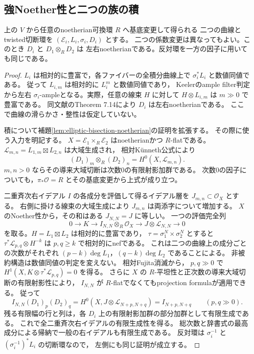 \subsection{強Noether性と二つの族の積}

\begin{lemma}\label{lem:degree-two-gorenstein-bisection}
上の $V$ から任意のnoetherian可換環 $R$ へ基底変更して得られる
二つの曲線とtwisted切断環を $(\mathcal E_i,L_i,\sigma_i,D_i)$ とする。
二つの係数変更は異なってもよい。このとき $D_i$ と $D_1\otimes_R D_2$ は
左右noetherianである。反対環を一方の因子に用いても同じである。
\end{lemma}
\begin{proof}
$L_i$ は相対的に豊富で，各ファイバーの全積分曲線上で
$\sigma_i^*L_i$ と数値同値である。
従って $L_{i,m}$ は相対的に $L_i^m$ と数値同値であり，
Keelerのample filter判定\cite[Theorem 1.3]{Keeler2003}から左右
$\sigma_i$-ampleとなる。実際，任意の線束 $H$ に対して
$H\otimes L_{i,m}$ は $m\gg0$ で豊富である。
同文献のTheorem 7.14により $D_i$ は左右noetherianである。
ここで曲線の滑らかさ・整性は仮定していない。

積について補題\ref{lem:elliptic-bisection-noetherian}の証明を拡張する。
その際に使う入力を明記する。
$X=\mathcal E_1\times_R\mathcal E_2$ はnoetherianかつ $R$-flatである。
$\mathcal L_{m,n}=L_{1,m}\boxtimes L_{2,n}$ は大域生成され，
相対K\"unneth公式により
\[
 (D_1)_m\otimes_R(D_2)_n=H^0(X,\mathcal L_{m,n}).
\]
$m,n>0$ ならその導来大域切断は次数0の有限射影加群である。
次数0の因子についても，$\pi_*\mathcal O=R$ とその基底変更から上式が成り立つ。

二重斉次右イデアル $I$ の各成分を評価して得るイデアル層を
$J_{m,n}\subset\mathcal O_X$ とする。
右側に掛ける線束の大域生成により $J_{m,n}$ は両添字について増加する。
$X$ のNoether性から，その和はある $J_{N,N}=J$ に等しい。
一つの評価完全列
\[
 0\longrightarrow K\longrightarrow I_{N,N}\otimes_R\mathcal O_X
   \longrightarrow J\otimes\mathcal L_{N,N}\longrightarrow0
\]
を取る。$H=L_1\boxtimes L_2$ は相対的に豊富であり，
$\tau=\sigma_1^N\times\sigma_2^N$ とすると
$\tau^*\mathcal L_{p,q}\otimes H^{-k}$ は $p,q\ge k$ で相対的にnefである。
これは二つの曲線上の成分ごとの次数がそれぞれ
$(p-k)\deg L_1$，$(q-k)\deg L_2$ であることによる。
非被約構造は数値同値の判定を変えない。
相対Fujita消滅\cite[Theorem 1.5, Erratum Theorem E2.5]{Keeler2003}から，
$p,q\gg0$ で $H^1(X,K\otimes\tau^*\mathcal L_{p,q})=0$ を得る。
さらに $X$ の $R$-平坦性と正次数の導来大域切断の有限射影性により，
$I_{N,N}$ が $R$-flatでなくてもprojection formulaが適用できる。
従って
\[
 I_{N,N}(D_1)_p(D_2)_q
 =H^0(X,J\otimes\mathcal L_{N+p,N+q})
 =I_{N+p,N+q}\qquad(p,q\gg0).
\]
残る有限幅の行と列は，各 $D_i$ 上の有限射影加群の部分加群として有限生成である。
これで全二重斉次右イデアルの有限生成性を得る。
総次数と辞書式の最高成分による帰納で一般の右イデアルも有限生成である。
反対環は $\sigma_i^{-1}$ と $(\sigma_i^{-1})^*L_i$ の切断環なので，
左側にも同じ証明が成立する。
\end{proof}

